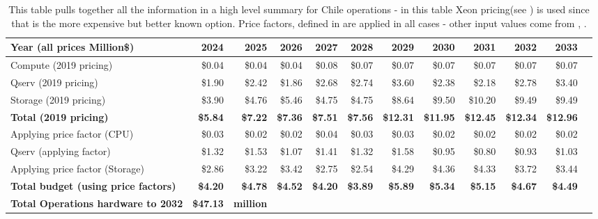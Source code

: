 \tiny \begin{longtable} { |p{}  |r  |r  |r  |r  |r  |r  |r  |r  |r  |r  |r |} 
\caption{This table pulls together all the information in a high level summary for Chile operations - in this table Xeon pricing(see ) is used since that is the more expensive but better known option. Price factors, defined in  are applied in all cases - other input values come from , .
 \label{tab:opsSumChile}}\\ 
\hline 
\textbf{Year  (all prices Million\$)}&\textbf{2024}&\textbf{2025}&\textbf{2026}&\textbf{2027}&\textbf{2028}&\textbf{2029}&\textbf{2030}&\textbf{2031}&\textbf{2032}&\textbf{2033} \\ \hline
{Compute (2019 pricing)}&{\$0.04}&{\$0.04}&{\$0.04}&{\$0.08}&{\$0.07}&{\$0.07}&{\$0.07}&{\$0.07}&{\$0.07}&{\$0.07} \\ \hline
{Qserv (2019 pricing)}&{\$1.90}&{\$2.42}&{\$1.86}&{\$2.68}&{\$2.74}&{\$3.60}&{\$2.38}&{\$2.18}&{\$2.78}&{\$3.40} \\ \hline
{Storage (2019 pricing)}&{\$3.90}&{\$4.76}&{\$5.46}&{\$4.75}&{\$4.75}&{\$8.64}&{\$9.50}&{\$10.20}&{\$9.49}&{\$9.49} \\ \hline
\textbf{Total (2019 pricing)}&\textbf{\$5.84}&\textbf{\$7.22}&\textbf{\$7.36}&\textbf{\$7.51}&\textbf{\$7.56}&\textbf{\$12.31}&\textbf{\$11.95}&\textbf{\$12.45}&\textbf{\$12.34}&\textbf{\$12.96} \\ \hline
{Applying price factor (CPU)}&{\$0.03}&{\$0.02}&{\$0.02}&{\$0.04}&{\$0.03}&{\$0.03}&{\$0.02}&{\$0.02}&{\$0.02}&{\$0.02} \\ \hline
{Qserv (applying factor)}&{\$1.32}&{\$1.53}&{\$1.07}&{\$1.41}&{\$1.32}&{\$1.58}&{\$0.95}&{\$0.80}&{\$0.93}&{\$1.03} \\ \hline
{Applying price factor (Storage)}&{\$2.86}&{\$3.22}&{\$3.42}&{\$2.75}&{\$2.54}&{\$4.29}&{\$4.36}&{\$4.33}&{\$3.72}&{\$3.44} \\ \hline
\textbf{Total budget (using price factors)}&\textbf{\$4.20}&\textbf{\$4.78}&\textbf{\$4.52}&\textbf{\$4.20}&\textbf{\$3.89}&\textbf{\$5.89}&\textbf{\$5.34}&\textbf{\$5.15}&\textbf{\$4.67}&\textbf{\$4.49} \\ \hline
\textbf{Total Operations hardware to 2032 }&\textbf{\$47.13}&\textbf{million}&&&&&&&& \\ \hline
\end{longtable} \normalsize
